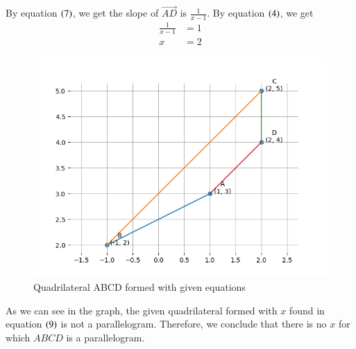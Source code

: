 \documentclass[journal]{IEEEtran}
\begin{document}
By equation $\left(7\right)$, we get the slope of $\vec{AD}$ is $\frac{1}{x-1}$.
\newline
By equation $\left(4\right)$, we get
\begin{align}
	\frac{1}{x - 1} &= 1\\
	x &= 2
\end{align}

\begin{figure}[h!]
   \centering
   \includegraphics[width=0.7\linewidth]{figs/graph.png}
   \caption{Quadrilateral ABCD formed with given equations}
   \label{label}
\end{figure}

As we can see in the graph, the given quadrilateral formed with $x$ found in equation $\left(9\right)$ is not a parallelogram.
Therefore, we conclude that there is no $x$ for which $ABCD$ is a parallelogram.
\end{document}
